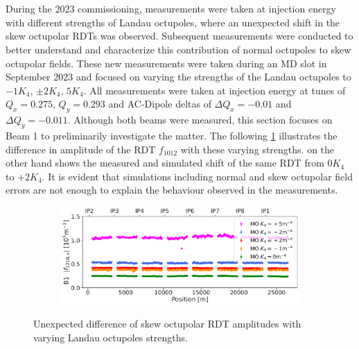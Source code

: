 \FloatBarrier
\section{}


\subsection{}

During the 2023 commissioning, measurements were taken at injection energy with different strengths
of Landau octupoles, where an unexpected shift in the skew octupolar RDTs was observed. Subsequent
measurements were conducted to better understand and characterize this contribution of normal
octupoles to skew octupolar fields. These new measurements were taken during an MD slot in September
2023 and focused on varying the strengths of the Landau octupoles to $-1K_4$, $\pm2 K_4$, $5K_4$.
All measurements were taken at injection energy at tunes of $Q_x = 0.275$, $Q_y = 0.293$ and
AC-Dipole deltas of $\Delta Q_x = -0.01$ and $\Delta Q_y = -0.011$. Although both beams were
measured, this section focuses on Beam 1 to preliminarily investigate the matter.  The following
\cref{fig:skew_octupolar:mo_different_levels_meas} illustrates the difference in amplitude of the
RDT $f_{1012}$ with these varying strengths.
 on the other hand shows the measured and simulated shift
of the same RDT from $0K_4$ to $+2K_4$. It is evident that simulations including normal and skew 
octupolar field errors are not enough to explain the behaviour observed in the measurements.

\begin{figure}[!htb]
    \centering
    \begin{subfigure}{0.8\textwidth}
        \includegraphics[width=\textwidth]{./images/skew_octupoles/f1210_AMP_all_measurements.pdf}
    \end{subfigure}
    \caption{Unexpected difference of skew octupolar RDT amplitudes with varying Landau octupoles
    strengths.}
    \label{fig:skew_octupolar:mo_different_levels_meas}
\end{figure}

